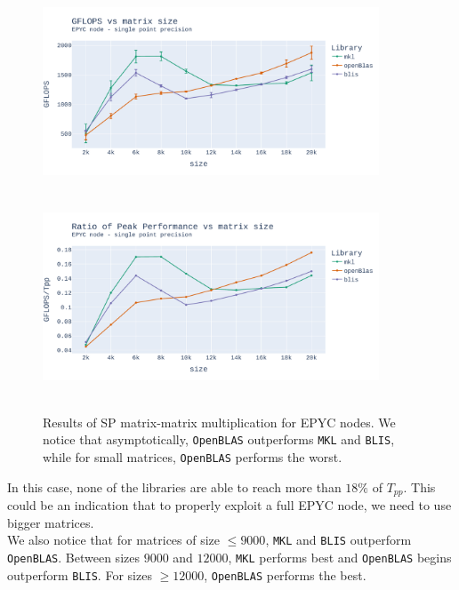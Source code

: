 \documentclass{report}
\begin{document}
\begin{figure}[H]
\hspace*{-2.5cm}
\includegraphics[width=10cm, height=6cm]{./images/fixed_cores_epyc_float_gflops.pdf}
\includegraphics[width=10cm, height=6cm]{./images/fixed_cores_epyc_float_gflops_ratio.pdf}
\caption{\label{fig:fixed_cores_epyc_float} Results of SP matrix-matrix multiplication 
for EPYC nodes. We notice that asymptotically, \texttt{OpenBLAS} outperforms 
\texttt{MKL} and \texttt{BLIS}, while for small matrices, \texttt{OpenBLAS} 
performs the worst.}
\end{figure} 

In this case, none of the libraries are able to reach more than $18\%$ of $T_{pp}$.
This could be an indication that to properly exploit a full EPYC node, we need 
to use bigger matrices.
\\

We also notice that for matrices of size $\leq 9000$, \texttt{MKL} and \texttt{BLIS} 
outperform \texttt{OpenBLAS}. Between sizes $9000$ and $12000$, \texttt{MKL} 
performs best and \texttt{OpenBLAS} begins outperform \texttt{BLIS}. 
For sizes $\geq 12000$, \texttt{OpenBLAS} performs the best.
\end{document}
